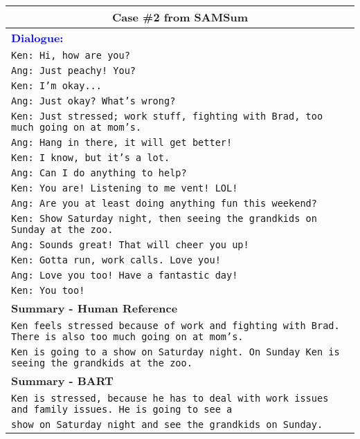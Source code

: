\documentclass[11pt]{article}
\begin{document}
\begin{table*}[t]
        \centering
        \begin{adjustbox}{width=1.00\textwidth,center}
        \begin{tabular}{ | l | }
        \toprule
        \multicolumn{1}{|c|}{\textbf{Case \#2 from SAMSum}} \\ \hline
        \textbf{\textcolor{blue}{Dialogue:}} \\ \hline
        
        \texttt{Ken: Hi, how are you?} \\
        \texttt{Ang: Just peachy! You?} \\
        \texttt{Ken: I'm okay...} \\
        \texttt{Ang: Just okay? What's wrong?} \\
        \texttt{Ken: Just stressed; work stuff, fighting with Brad, too much going on at mom's.} \\
        \texttt{Ang: Hang in there, it will get better!} \\
        \texttt{Ken: I know, but it's a lot.} \\
        \texttt{Ang: Can I do anything to help?} \\
        \texttt{Ken: You are! Listening to me vent! LOL!} \\
        \texttt{Ang: Are you at least doing anything fun this weekend?} \\
        \texttt{Ken: Show Saturday night, then seeing the grandkids on Sunday at the zoo.} \\
        \texttt{Ang: Sounds great! That will cheer you up!} \\
        \texttt{Ken: Gotta run, work calls. Love you!} \\
        \texttt{Ang: Love you too! Have a fantastic day!} \\
        \texttt{Ken: You too!} \\
        
        \hline \hline
        
        \textbf{Summary - Human Reference} \\ \hline
        \texttt{Ken feels stressed because of work and fighting with Brad. There is also too much going on at mom's.} \\
        \texttt{Ken is going to a show on Saturday night. On Sunday Ken is seeing the grandkids at the zoo.} \\ \hline
        
        \textbf{Summary - BART} \\ \hline 
        \texttt{Ken is stressed, because he has to deal with work issues and family issues. He is going to see a } \\
        \texttt{show on Saturday night and see the grandkids on Sunday.} \\ \hline \hline
        

\end{tabular}
\end{adjustbox}
\end{table*}
\end{document}
